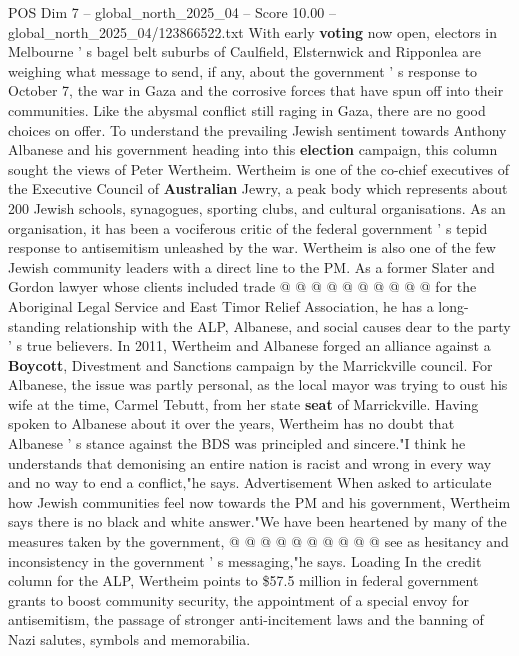 \begin{textsample}{POS Dim 7 – global\_north\_2025\_04 – Score 10.00 – global\_north\_2025\_04/123866522.txt}  \label{ex:f7_pos_358}
With early \textbf{voting} now open, electors in Melbourne ' s bagel belt suburbs of Caulfield, Elsternwick and Ripponlea are weighing what message to send, if any, about the government ' s response to October 7, the war in Gaza and the corrosive forces that have spun off into their communities.
Like the abysmal conflict still raging in Gaza, there are no good choices on offer.
To understand the prevailing Jewish sentiment towards Anthony Albanese and his government heading into this \textbf{election} campaign, this column sought the views of Peter Wertheim.
Wertheim is one of the co-chief executives of the Executive Council of \textbf{Australian} Jewry, a peak body which represents about 200 Jewish schools, synagogues, sporting clubs, and cultural organisations.
As an organisation, it has been a vociferous critic of the federal government ' s tepid response to antisemitism unleashed by the war.
Wertheim is also one of the few Jewish community leaders with a direct line to the PM.
As a former Slater and Gordon lawyer whose clients included trade @ @ @ @ @ @ @ @ @ @ for the Aboriginal Legal Service and East Timor Relief Association, he has a long-standing relationship with the ALP, Albanese, and social causes dear to the party ' s true believers.
In 2011, Wertheim and Albanese forged an alliance against a \textbf{Boycott}, Divestment and Sanctions campaign by the Marrickville council.
For Albanese, the issue was partly personal, as the local mayor was trying to oust his wife at the time, Carmel Tebutt, from her state \textbf{seat} of Marrickville.
Having spoken to Albanese about it over the years, Wertheim has no doubt that Albanese ' s stance against the BDS was principled and sincere."I think he understands that demonising an entire nation is racist and wrong in every way and no way to end a conflict,"he says.
Advertisement When asked to articulate how Jewish communities feel now towards the PM and his government, Wertheim says there is no black and white answer."We have been heartened by many of the measures taken by the government, @ @ @ @ @ @ @ @ @ @ see as hesitancy and inconsistency in the government ' s messaging,"he says.
Loading In the credit column for the ALP, Wertheim points to \$57.5 million in federal government grants to boost community security, the appointment of a special envoy for antisemitism, the passage of stronger anti-incitement laws and the banning of Nazi salutes, symbols and memorabilia.

\end{textsample}
